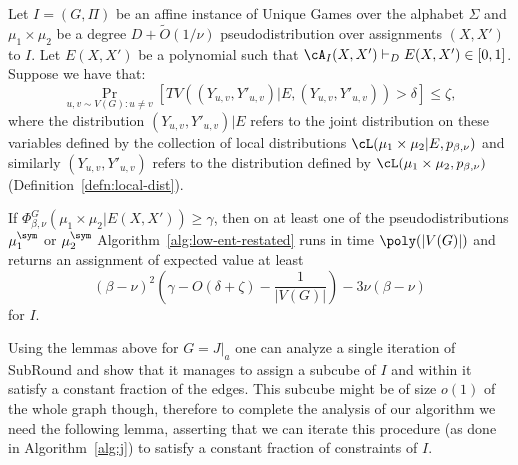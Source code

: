 \begin{lemma}\label{lem:round-j}
Let $I = (G, \Pi)$ be an affine instance of Unique Games over the alphabet $\Sigma$ and $\mu_1 \times \mu_2$ be a degree $D+\widetilde{O}(1/\nu)$ pseudodistribution over assignments $(X,X')$ to $I$. Let $E(X,X')$ be a polynomial such that $\cA_I(X,X') \vdash_D E(X,X') \in [0,1]$. Suppose we have that: 
\[\Pr_{u,v \sim V(G): u \neq v}[TV((Y_{u,v},Y'_{u,v})|E , (Y_{u,v},Y'_{u,v})) > \delta] \leq \zeta,\]
where the distribution $(Y_{u,v},Y'_{u,v})|E$ refers to the joint distribution on these variables defined by the collection of local distributions $\cL(\mu_1 \times \mu_2|E, p_{\beta,\nu})$ and similarly $(Y_{u,v},Y'_{u,v})$ refers to the distribution defined by $\cL(\mu_1 \times \mu_2,p_{\beta,\nu})$ (Definition~\ref{defn:local-dist}). 

If $\Phi^G_{\beta,\nu}(\mu_1 \times \mu_2 | E(X,X')) \geq \gamma$, then on at least one of the pseudodistributions $\mu^\sym_1$ or $\mu^\sym_2$ Algorithm~\ref{alg:low-ent-restated} runs in time $\poly(|V(G)|)$ and returns an assignment of expected value at least 
\[
(\beta - \nu)^2\left(\gamma - O(\delta+\zeta) - \frac{1}{|V(G)|}\right) - 3\nu(\beta - \nu)
\]
for $I$.
\end{lemma}

Using the lemmas above for $G = J|_a$ one can analyze a single iteration of SubRound and show that it manages to assign a subcube of $I$ and within it satisfy a constant fraction of the edges. This subcube might be of size $o(1)$ of the whole graph though, therefore to complete the analysis of our algorithm we need the following lemma, asserting that we can iterate this procedure (as done in Algorithm~\ref{alg:j}) to satisfy a constant fraction of constraints of $I$. 


